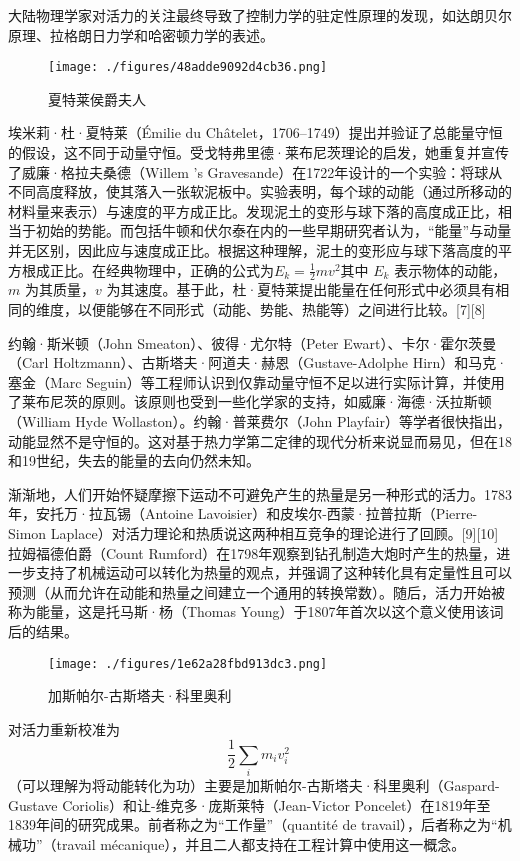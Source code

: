 大陆物理学家对活力的关注最终导致了控制力学的驻定性原理的发现，如达朗贝尔原理、拉格朗日力学和哈密顿力学的表述。
\begin{figure}[ht]
\centering
\texttt{[image: ./figures/48adde9092d4cb36.png]}
\caption{夏特莱侯爵夫人} \label{fig_NLSH_3}
\end{figure}
埃米莉·杜·夏特莱（Émilie du Châtelet，1706–1749）提出并验证了总能量守恒的假设，这不同于动量守恒。受戈特弗里德·莱布尼茨理论的启发，她重复并宣传了威廉·格拉夫桑德（Willem 's Gravesande）在1722年设计的一个实验：将球从不同高度释放，使其落入一张软泥板中。实验表明，每个球的动能（通过所移动的材料量来表示）与速度的平方成正比。发现泥土的变形与球下落的高度成正比，相当于初始的势能。而包括牛顿和伏尔泰在内的一些早期研究者认为，“能量”与动量并无区别，因此应与速度成正比。根据这种理解，泥土的变形应与球下落高度的平方根成正比。在经典物理中，正确的公式为\(E_k = \frac{1}{2}mv^2\)其中 \( E_k \) 表示物体的动能，\( m \) 为其质量，\( v \) 为其速度。基于此，杜·夏特莱提出能量在任何形式中必须具有相同的维度，以便能够在不同形式（动能、势能、热能等）之间进行比较。[7][8]

约翰·斯米顿（John Smeaton）、彼得·尤尔特（Peter Ewart）、卡尔·霍尔茨曼（Carl Holtzmann）、古斯塔夫·阿道夫·赫恩（Gustave-Adolphe Hirn）和马克·塞金（Marc Seguin）等工程师认识到仅靠动量守恒不足以进行实际计算，并使用了莱布尼茨的原则。该原则也受到一些化学家的支持，如威廉·海德·沃拉斯顿（William Hyde Wollaston）。约翰·普莱费尔（John Playfair）等学者很快指出，动能显然不是守恒的。这对基于热力学第二定律的现代分析来说显而易见，但在18和19世纪，失去的能量的去向仍然未知。

渐渐地，人们开始怀疑摩擦下运动不可避免产生的热量是另一种形式的活力。1783年，安托万·拉瓦锡（Antoine Lavoisier）和皮埃尔-西蒙·拉普拉斯（Pierre-Simon Laplace）对活力理论和热质说这两种相互竞争的理论进行了回顾。[9][10] 拉姆福德伯爵（Count Rumford）在1798年观察到钻孔制造大炮时产生的热量，进一步支持了机械运动可以转化为热量的观点，并强调了这种转化具有定量性且可以预测（从而允许在动能和热量之间建立一个通用的转换常数）。随后，活力开始被称为能量，这是托马斯·杨（Thomas Young）于1807年首次以这个意义使用该词后的结果。
\begin{figure}[ht]
\centering
\texttt{[image: ./figures/1e62a28fbd913dc3.png]}
\caption{加斯帕尔-古斯塔夫·科里奥利} \label{fig_NLSH_4}
\end{figure}
对活力重新校准为
\[
\frac{1}{2} \sum _{i}m_{i}v_{i}^{2}~
\]
（可以理解为将动能转化为功）主要是加斯帕尔-古斯塔夫·科里奥利（Gaspard-Gustave Coriolis）和让-维克多·庞斯莱特（Jean-Victor Poncelet）在1819年至1839年间的研究成果。前者称之为“工作量”（quantité de travail），后者称之为“机械功”（travail mécanique），并且二人都支持在工程计算中使用这一概念。

